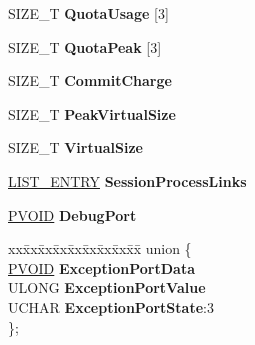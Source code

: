\begin{DoxyCompactItemize}
\item 
\mbox{\label{struct___e_p_r_o_c_e_s_s_ad9d979f93f0a3dbbe2aed4c6c1a9a2e2}} 
S\+I\+Z\+E\+\_\+T {\bfseries Quota\+Usage} \mbox{[}3\mbox{]}
\item 
\mbox{\label{struct___e_p_r_o_c_e_s_s_a32c5df5a4e50e744971d492293d442fd}} 
S\+I\+Z\+E\+\_\+T {\bfseries Quota\+Peak} \mbox{[}3\mbox{]}
\item 
\mbox{\label{struct___e_p_r_o_c_e_s_s_a0ca6d3ba672fc5ff3b3a040a39aeaa8c}} 
S\+I\+Z\+E\+\_\+T {\bfseries Commit\+Charge}
\item 
\mbox{\label{struct___e_p_r_o_c_e_s_s_aa5c3053acc46a5533a7e6e83a1414818}} 
S\+I\+Z\+E\+\_\+T {\bfseries Peak\+Virtual\+Size}
\item 
\mbox{\label{struct___e_p_r_o_c_e_s_s_ac8d795645650487b06b8a7011f574db2}} 
S\+I\+Z\+E\+\_\+T {\bfseries Virtual\+Size}
\item 
\mbox{\label{struct___e_p_r_o_c_e_s_s_acd4aac06c79fd70b1a33834d673ed7cf}} 
\hyperlink{struct___l_i_s_t___e_n_t_r_y}{L\+I\+S\+T\+\_\+\+E\+N\+T\+RY} {\bfseries Session\+Process\+Links}
\item 
\mbox{\label{struct___e_p_r_o_c_e_s_s_a407a72e8416c08dce0660367f5f5e9db}} 
\hyperlink{interfacevoid}{P\+V\+O\+ID} {\bfseries Debug\+Port}
\item 
\mbox{\label{struct___e_p_r_o_c_e_s_s_aa9e7303b2b2259d8c9182908c18504f8}} 
\begin{tabbing}
xx\=xx\=xx\=xx\=xx\=xx\=xx\=xx\=xx\=\kill
union \{\\
\>\hyperlink{interfacevoid}{PVOID} {\bfseries ExceptionPortData}\\
\>ULONG {\bfseries ExceptionPortValue}\\
\>UCHAR {\bfseries ExceptionPortState}:3\\
\}; \\


\end{tabbing}
\end{DoxyCompactItemize}
